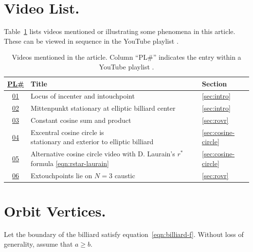 \documentclass{amsart}
\theoremstyle{definition}
\begin{document}
\appendix
\section{Video List.} 
\label{app:videos}
Table~\ref{tab:playlist} lists videos mentioned or illustrating some phenomena in this article. These can be viewed in sequence in the YouTube playlist \cite{reznik2020-playlist-proofs}.

\begin{table}[H]
\caption{Videos mentioned in the article. Column ``PL\#'' indicates the entry within a YouTube playlist \cite{reznik2020-playlist-proofs}.}
\begin{tabular}{c|l|l}
\href{https://bit.ly/2Gmn73e}{PL\#} & Title & Section\\
\hline

\href{https://youtu.be/9xU6T7hQMzs}{01} &
{Locus of incenter and intouchpoint} & \ref{sec:intro} \\

\href{https://youtu.be/tMrBqfRBYik}{02} &
{Mittenpunkt stationary at elliptic billiard center} & \ref{sec:intro} \\

\href{https://youtu.be/P8ykpE_ZbZ8}{03} &
{Constant cosine sum and product} &
\ref{sec:rovr} \\

\href{https://youtu.be/ACinCf-D_Ok}{04} &
\makecell[lt]{Excentral cosine circle is\\stationary and exterior to elliptic billiard} &
\ref{sec:cosine-circle}\\

\href{https://youtu.be/hCQIT6_XhaQ}{05} &
\makecell[lt]{Alternative cosine circle video\\with D. Laurain's $r^*$ formula \eqref{eqn:rstar-laurain}} &
\ref{sec:cosine-circle}\\

\href{https://youtu.be/1gYb5Y3-rQI}{06} & Extouchpoints lie on $N=3$ caustic
 &
\ref{sec:rovr}\\

\end{tabular}
\label{tab:playlist}
\end{table}

\section{Orbit Vertices.}
\label{app:orbit-vertices}
Let the boundary of the billiard satisfy equation~\eqref{eqn:billiard-f}. Without loss of generality, assume that $a {\ge} b$.
\end{document}
